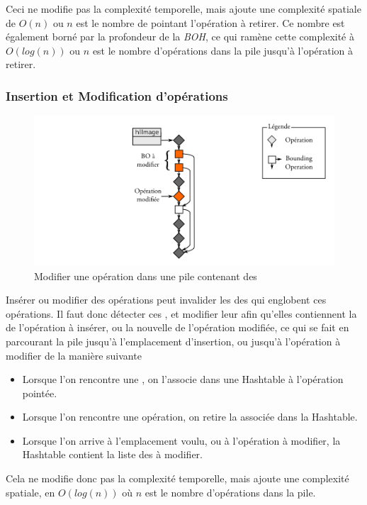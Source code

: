 			Ceci ne modifie pas la complexité temporelle, mais ajoute une complexité spatiale
			de $O(n)$ ou $n$ est le nombre de \BO pointant l'opération à retirer. Ce nombre est également borné par
			la profondeur de la \emph{BOH}, ce qui ramène cette complexité à $O(log(n))$ ou $n$ est le nombre d'opérations dans
			la pile jusqu'à l'opération à retirer. 

			\subsubsection{Insertion et Modification d'opérations}
			\begin{figure}[ht]
				\centering
				\includegraphics[width=\textwidth]{images/bo-modify} 
				\caption{Modifier une opération dans une pile contenant des \BO}
				\label{fig:bo-modify}
			\end{figure}
			Insérer ou modifier des opérations peut invalider les \BB des \BO qui englobent ces opérations. Il faut
			donc détecter ces \BO, et modifier leur \BB afin qu'elles contiennent la \BB de l'opération à insérer, ou la
			nouvelle \BB de l'opération modifiée, ce qui se fait en parcourant la pile jusqu'à l'emplacement d'insertion,
			ou jusqu'à l'opération à modifier de la manière suivante
			\begin{itemize}
				\item Lorsque l'on rencontre une \BO, on l'associe dans une Hashtable à l'opération pointée.
				\item Lorsque l'on rencontre une opération, on retire la \BO associée dans la Hashtable.
				\item Lorsque l'on arrive à l'emplacement voulu, ou à l'opération à modifier, la Hashtable
				contient la liste des \BO à modifier.
			\end{itemize}
			Cela ne modifie donc pas la complexité temporelle, mais ajoute une complexité spatiale, en $O(log(n))$ où $n$
			est le nombre d'opérations dans la pile.

